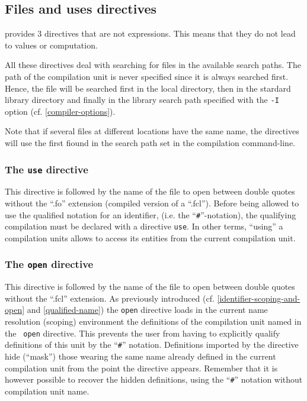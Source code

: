 \subsection{Files and uses directives}
\label{file directive}
{\focal} provides 3 directives that are not expressions. This means
that they do not lead to values or computation.

All these directives deal with searching for files in the available
search paths. The path of the compilation unit is never specified
since it is always searched first. Hence, the file will be searched
first in the local directory, then in the stardard library directory
and finally in the library search path specified with the {\tt -I}
option (cf. \ref{compiler-options}).

Note that if several files at different locations have the same name,
the directives will use the first fiound in the search path set in the
compilation command-line.


\subsubsection{The {\tt use} directive}
This directive is followed by the name of the file to open between
double quotes without the ``.fo'' extension (compiled version of a ``.fcl'').
Before being allowed to use the qualified notation for an identifier,
(i.e. the ``{\tt\#}''-notation), the qualifying compilation must be
declared with a directive {\tt use}. In other terms,
``using'' a compilation units allows to access its entities from the
current compilation unit.


\subsubsection{The {\tt open} directive}

This directive is followed by the name of the file to open between
double quotes without the ``.fcl'' extension. As previously introduced
(cf. \ref{identifier-scoping-and-open} and \ref{qualified-name}) the
{\tt open} directive loads in the current name resolution (scoping)
environment the definitions of the compilation unit named in the {\tt
  open} directive. This prevents the user from having to explicitly
qualify definitions of this unit by the ``{\tt\#}''
notation. Definitions imported by the directive hide (``mask'') those
wearing the same name already defined in the current compilation unit
from the point the directive appears. Remember that it is however
possible to recover the hidden definitions, using the ``{\tt\#}''
notation without compilation unit name.

